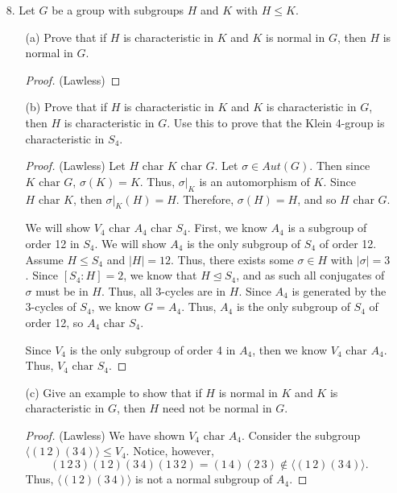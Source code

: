 \documentclass[10pt]{article}
\newcommand{\la}{\langle}
\newcommand{\ra}{\rangle}
\renewcommand{\char}{\text{ char }}
\begin{document}
\begin{itemize}
\item[8.] Let $G$ be a group with subgroups $H$ and $K$ with $H \leq K$. 
\begin{itemize}

\item[(a)] Prove that if $H$ is characteristic in $K$ and $K$ is normal in $G$, then $H$ is normal in $G$. 

\begin{proof} (Lawless) 


\end{proof}

\item[(b)] Prove that if $H$ is characteristic in $K$ and $K$ is characteristic in $G$, then $H$ is characteristic in $G$. Use this to prove that the Klein 4-group is characteristic in $S_4$. 

\begin{proof} (Lawless) 
Let $H \char K \char G$. Let $\sigma \in Aut(G)$. Then since $K \char G$,  $\sigma(K) = K$. Thus, $\sigma|_K$ is an automorphism of $K$. Since $H \char K$, then $\sigma|_K(H) = H$. Therefore, $\sigma(H) = H$, and so $H \char G$. 

We will show $V_4 \char A_4 \char S_4$. First, we know $A_4$ is a subgroup of order 12 in $S_4$. We will show $A_4$ is the only subgroup of $S_4$ of order 12. Assume $H \leq S_4$ and $|H| = 12$. Thus, there exists some $\sigma \in H$ with $|\sigma| = 3$. Since $[S_4:H] = 2$, we know that $H \unlhd S_4$, and as such all conjugates of $\sigma$ must be in $H$. Thus, all 3-cycles are in $H$. Since $A_4$ is generated by the 3-cycles of $S_4$, we know $G = A_4$. Thus, $A_4$ is the only subgroup of $S_4$ of order 12, so $A_4 \char S_4$. 

Since $V_4$ is the only subgroup of order 4 in $A_4$, then we know $V_4 \char A_4$. Thus, $V_4 \char S_4$. 
\end{proof}

\item[(c)] Give an example to show that if $H$ is normal in $K$ and $K$ is characteristic in $G$, then $H$ need not be normal in $G$. 

\begin{proof} (Lawless) 
We have shown $V_4 \char A_4$. Consider the subgroup $\la (1\, 2)(3\, 4)\ra \leq V_4$. Notice, however,
$$(1\,2\,3)(1\,2)(3\,4)(1\,3\,2) = (1\, 4)(2\, 3) \notin \la (1\, 2)(3\, 4)\ra.$$
Thus, $\la (1\,2)(3\,4)\ra$ is not a normal subgroup of $A_4$. 

\end{proof}

\end{itemize}
\end{itemize}
\end{document}
